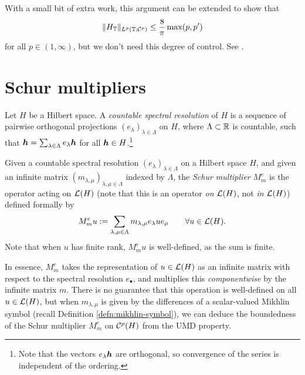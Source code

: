 \begin{rmk}
  With a small bit of extra work, this argument can be extended to show that
  \begin{equation*}
    \|H_{\mathbb{T}}\|_{L^p(\mathbb{T};\mathcal{C}^{p})} \leq \frac{8}{\pi} \max(p,p')
  \end{equation*}
  for all $p \in (1,\infty)$, but we don't need this degree of control.
  See \cite[Proposition 5.4.2]{HNVW16}.
\end{rmk}

\section{Schur multipliers}

Let $H$ be a Hilbert space.
A \emph{countable spectral resolution} of $H$ is a sequence of pairwise orthogonal projections $(e_{\lambda})_{\lambda \in \Lambda}$ on $H$, where $\Lambda \subset \mathbb{R}$ is countable, such that $\bm{h} = \sum_{\lambda \in \Lambda} e_{\lambda} \bm{h}$ for all $\bm{h} \in H$.\footnote{Note that the vectors $e_{\lambda} \bm{h}$ are orthogonal, so convergence of the series is independent of the ordering.}

\begin{defn}
  Given a countable spectral resolution $(e_{\lambda})_{\lambda \in \Lambda}$ on a Hilbert space $H$, and given an infinite matrix $(m_{\lambda,\mu})_{\lambda,\mu \in \Lambda}$ indexed by $\Lambda$, the \emph{Schur multiplier} $M_{m}^{e}$ is the operator acting on $\mathcal{L}(H)$ (note that this is an operator \emph{on} $\mathcal{L}(H)$, not \emph{in} $\mathcal{L}(H)$) defined formally by
  \begin{equation*}
    M_{m}^{e} u := \sum_{\lambda, \mu \in \Lambda} m_{\lambda,\mu} e_{\lambda} u e_{\mu} \qquad \forall u \in \mathcal{L}(H).
  \end{equation*}
  Note that when $u$ has finite rank, $M_{m}^{e} u$ is well-defined, as the sum is finite.
\end{defn}

In essence, $M_{m}^{e}$ takes the representation of $u \in \mathcal{L}(H)$ as an infinite matrix with respect to the spectral resolution $e_{\bullet}$, and multiplies this \emph{componentwise} by the infinite matrix $m$.
There is no guarantee that this operation is well-defined on all $u \in \mathcal{L}(H)$, but when $m_{\lambda,\mu}$ is given by the differences of a scalar-valued Mikhlin symbol (recall Definition \ref{defn:mikhlin-symbol}), we can deduce the boundedness of the Schur multiplier $M_{m}^{e}$ on $\mathcal{C}^{p}(H)$ from the UMD property.

